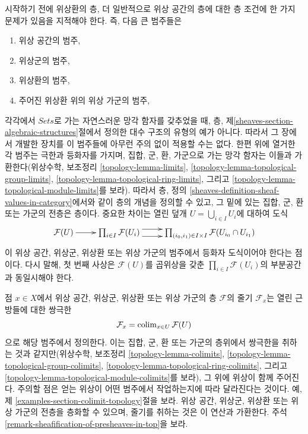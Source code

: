 \medskip\noindent
시작하기 전에 위상환의 층, 더 일반적으로 위상 공간의 층에 대한
층 조건에 한 가지 문제가 있음을 지적해야 한다. 즉, 다음 큰 범주들은
\begin{enumerate}
\item 위상 공간의 범주,
\item 위상군의 범주,
\item 위상환의 범주,
\item 주어진 위상환 위의 위상 가군의 범주,
\end{enumerate}
각각에서 $\textit{Sets}$로 가는 자연스러운 망각 함자를 갖추었을 때,
층, 제\ref{sheaves-section-algebraic-structures}절에서 정의한
대수 구조의 유형의 예가 아니다. 따라서 그 장에서 개발한 장치를
이 범주들에 아무런 주의 없이 적용할 수는 없다. 한편 위에 열거한
각 범주는 극한과 등화자를 가지며, 집합, 군, 환, 가군으로 가는
망각 함자는 이들과 가환한다(위상수학, 보조정리
\ref{topology-lemma-limits},
\ref{topology-lemma-topological-group-limits},
\ref{topology-lemma-topological-ring-limits}, 그리고
\ref{topology-lemma-topological-module-limits}를 보라).
따라서 층, 정의
\ref{sheaves-definition-sheaf-values-in-category}에서와 같이
층의 개념을 정의할 수 있고, 그 밑에 있는 집합, 군, 환 또는 가군의
전층은 층이다. 중요한 차이는 열린 덮개
$U = \bigcup_{i \in I} U_i$에 대하여 도식
$$
\xymatrix{
\mathcal{F}(U) \ar[r]
&
\prod\nolimits_{i\in I}
\mathcal{F}(U_i)
\ar@<1ex>[r] \ar@<-1ex>[r]
&
\prod\nolimits_{(i_0, i_1) \in I \times I}
\mathcal{F}(U_{i_0} \cap U_{i_1})
}
$$
이 위상 공간, 위상군, 위상환 또는 위상 가군의 범주에서
등화자 도식이어야 한다는 점이다. 다시 말해, 첫 번째 사상은
$\mathcal{F}(U)$를 곱위상을 갖춘
$\prod_{i \in I} \mathcal{F}(U_i)$의 부분공간과 동일시해야 한다.

\medskip\noindent
점 $x \in X$에서 위상 공간, 위상군, 위상환 또는 위상 가군의 층
$\mathcal{F}$의 줄기 $\mathcal{F}_x$는 열린 근방들에 대한 쌍극한
$$
\mathcal{F}_x = \mathop{\mathrm{colim}}\nolimits_{x\in U} \mathcal{F}(U)
$$
으로 해당 범주에서 정의한다. 이는 집합, 군, 환 또는 가군의 층위에서
쌍극한을 취하는 것과 같지만(위상수학, 보조정리
\ref{topology-lemma-colimits},
\ref{topology-lemma-topological-group-colimits},
\ref{topology-lemma-topological-ring-colimits}, 그리고
\ref{topology-lemma-topological-module-colimits}를 보라),
그 위에 위상이 함께 주어진다. 주의할 점은 얻는 위상이 어떤 범주에서
작업하는지에 따라 달라진다는 것이다. 예, 제
\ref{examples-section-colimit-topology}절을 보라.
위상 공간, 위상군, 위상환 또는 위상 가군의 전층을 층화할 수 있으며,
줄기를 취하는 것은 이 연산과 가환한다. 주석
\ref{remark-sheafification-of-presheaves-in-top}을 보라.

